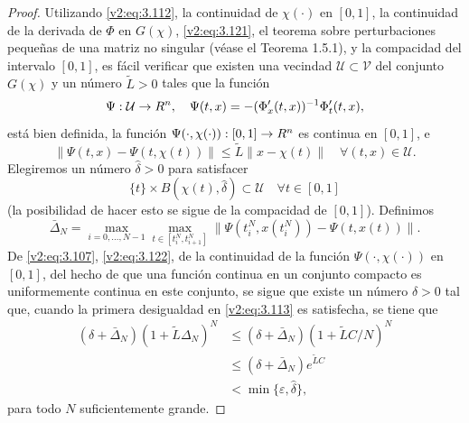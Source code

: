 \begin{proof}
    Utilizando \eqref{v2:eq:3.112}, la continuidad de $\chi(\cdot)$ en $[0, 1]$, la continuidad de la derivada de $\Phi$ en $G(\chi)$, \eqref{v2:eq:3.121}, el teorema sobre perturbaciones pequeñas de una matriz no singular (véase el Teorema 1.5.1), y la compacidad del intervalo $[0, 1]$, es fácil verificar que existen una vecindad $\mathcal{U} \subset \mathcal{V}$ del conjunto $G(\chi)$ y un número $\tilde{L} > 0$ tales que la función
    \[
        \Psi : \mathcal{U} \to R^n, \quad \Psi(t, x) = -(\Phi'_x(t, x))^{-1} \Phi'_t(t, x),
    \]
    está bien definida, la función $\Psi(\cdot, \chi(\cdot)) : [0, 1] \to R^n$ es continua en $[0, 1]$, e
    \begin{equation}
        \|\Psi(t, x) - \Psi(t, \chi(t))\| \le \tilde{L} \|x - \chi(t)\| \quad \forall (t, x) \in \mathcal{U}.
        \label{v2:eq:3.123}
    \end{equation}
    Elegiremos un número $\hat{\delta} > 0$ para satisfacer
    \[
        \{t\} \times B(\chi(t), \hat{\delta}) \subset \mathcal{U} \quad \forall t \in [0, 1]
    \]
    (la posibilidad de hacer esto se sigue de la compacidad de $[0, 1]$).
    Definimos
    \begin{equation}
        \bar{\Delta}_N = \max_{i=0, \dots, N-1} \max_{t \in [t_i^N, t_{i+1}^N]} \|\Psi(t_i^N, x(t_i^N)) - \Psi(t, x(t))\|.
        \label{v2:eq:3.124}
    \end{equation}
    De \eqref{v2:eq:3.107}, \eqref{v2:eq:3.122}, de la continuidad de la función $\Psi(\cdot, \chi(\cdot))$ en $[0, 1]$, del hecho de que una función continua en un conjunto compacto es uniformemente continua en este conjunto, se sigue que existe un número $\delta > 0$ tal que, cuando la primera desigualdad en \eqref{v2:eq:3.113} es satisfecha, se tiene que
    \begin{align}
        (\delta + \bar{\Delta}_N)(1 + \tilde{L}\Delta_N)^N &\le (\delta + \bar{\Delta}_N)(1 + \tilde{L}C/N)^N \nonumber \\
        &\le (\delta + \bar{\Delta}_N) e^{\tilde{L}C} \nonumber \\
        &< \min\{\varepsilon, \hat{\delta}\}, \label{v2:eq:3.125}
    \end{align}
    para todo $N$ suficientemente grande.
    

\end{proof}
